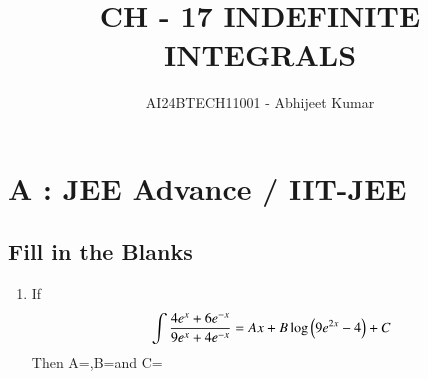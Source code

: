 \documentclass[article,12pt,onecolumn]{IEEEtran}
\theoremstyle{remark}
\begin{document}

\vspace{3cm}
\title{CH - 17 INDEFINITE INTEGRALS}
\author{AI24BTECH11001 - Abhijeet Kumar}
\maketitle
\bigskip
\section{A : JEE Advance / IIT-JEE}
\renewcommand{\thefigure}{\theenumi}
\renewcommand{\thetable}{\theenumi}
\subsection{Fill in the Blanks}
\begin{enumerate}
\item If 
\begin{align*}
    \int\frac{4e^{x}+ 6e^{-x}}{9e^{x} + 4e^{-x}} = Ax+B\log\left(9e^{2x}-4\right) + C
\end{align*}
Then A=\dotso,B=\dotso and C=\dotso
\hfill {}
\end{enumerate}
\end{document}
